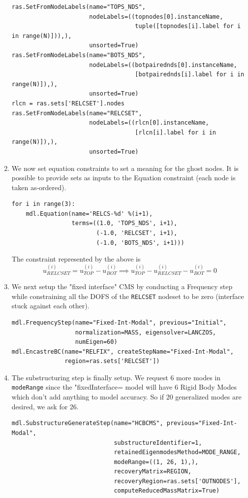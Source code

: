 \documentclass[11pt]{article}
\begin{document}
\begin{enumerate}
\begin{verbatim}
ras.SetFromNodeLabels(name="TOPS_NDS", 
                      nodeLabels=((topnodes[0].instanceName, 
                                   tuple([topnodes[i].label for i in range(N)])),),
                      unsorted=True)
ras.SetFromNodeLabels(name="BOTS_NDS", 
                      nodeLabels=((botpairednds[0].instanceName, 
                                   [botpairednds[i].label for i in range(N)]),),
                      unsorted=True)
rlcn = ras.sets['RELCSET'].nodes
ras.SetFromNodeLabels(name="RELCSET",
                      nodeLabels=((rlcn[0].instanceName,
                                   [rlcn[i].label for i in range(N)]),),
                      unsorted=True)
\end{verbatim}
\item We now set equation constraints to set a meaning for the ghost nodes.
It is possible to provide sets as inputs to the Equation constraint (each node is taken as-ordered).
\begin{verbatim}
for i in range(3):
    mdl.Equation(name='RELCS-%d' %(i+1),
                 terms=((1.0, 'TOPS_NDS', i+1),
                        (-1.0, 'RELCSET', i+1),
                        (-1.0, 'BOTS_NDS', i+1)))
\end{verbatim}
The constraint represented by the above is
$$ u^{(i)}_{RELCSET} = u^{(i)}_{TOP} - u^{(i)}_{BOT} \implies
   u^{(i)}_{TOP} - u^{(i)}_{RELCSET} - u^{(i)}_{BOT} = 0 $$
\item We next setup the "fixed interface" CMS by conducting a Frequency step while constraining all the DOFS of the \texttt{RELCSET} nodeset to be zero (interface stuck against each other).
\begin{verbatim}
mdl.FrequencyStep(name="Fixed-Int-Modal", previous="Initial",
                  normalization=MASS, eigensolver=LANCZOS,
                  numEigen=60)
mdl.EncastreBC(name="RELFIX", createStepName="Fixed-Int-Modal",
               region=ras.sets['RELCSET'])
\end{verbatim}
\item The substructuring step is finally setup.
We request 6 more modes in \texttt{modeRange} since the "fixedInterface= model will have 6 Rigid Body Modes which don't add anything to model accuracy.
So if 20 generalized modes are desired, we ask for 26. 
\begin{verbatim}
mdl.SubstructureGenerateStep(name="HCBCMS", previous="Fixed-Int-Modal",
                             substructureIdentifier=1, 
                             retainedEigenmodesMethod=MODE_RANGE,
                             modeRange=((1, 26, 1),),
                             recoveryMatrix=REGION,
                             recoveryRegion=ras.sets['OUTNODES'],
                             computeReducedMassMatrix=True)


\end{verbatim}
\end{enumerate}
\end{document}
